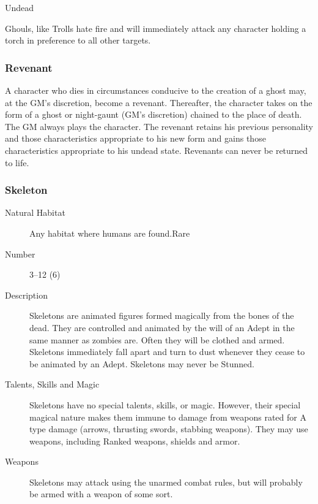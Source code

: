 \begin{mmgroup}{Undead}
\begin{mmcomment}
 Ghouls, like Trolls hate fire and will immediately attack
any character holding a torch in preference to all other targets.

\end{mmcomment}

\subsubsection{Revenant}

\begin{mmcomment}
 A character who dies in circumstances conducive to the
creation of a ghost may, at the GM's discretion, become a revenant.
Thereafter, the character takes on the form of a ghost or night-gaunt
(GM's discretion) chained to the place of death. The GM always plays
the character. The revenant retains his previous personality and those
characteristics appropriate to his new form and gains those
characteristics appropriate to his undead state.  Revenants can never
be returned to life.

\end{mmcomment}

\subsubsection{Skeleton}

\begin{description}
\item[Natural Habitat]Any habitat where humans are found.Rare

\item[Number]3–12 (6)

\item[Description] Skeletons are animated figures formed magically from the
bones of the dead. They are controlled and animated by the will of an
Adept in the same manner as zombies are.  Often they will be clothed
and armed. Skeletons immediately fall apart and turn to dust whenever
they cease to be animated by an Adept. Skeletons may never be Stunned.

\item[Talents, Skills and Magic] Skeletons have no special talents, skills, or magic.
However, their special magical nature makes them immune to damage from
weapons rated for A type damage (arrows, thrusting swords, stabbing
weapons). They may use weapons, including Ranked weapons, shields and
armor.

\item[Weapons] Skeletons may attack using the unarmed combat rules, but
will probably be armed with a weapon of some sort.


\end{description}
\end{mmgroup}
